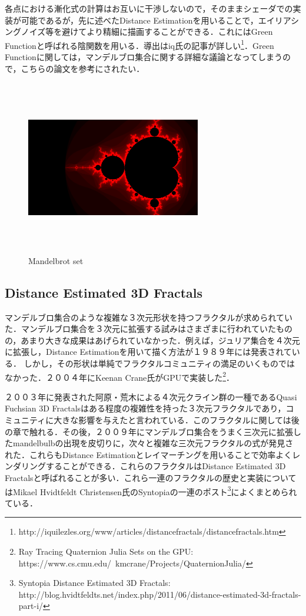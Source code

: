 各点における漸化式の計算はお互いに干渉しないので，そのままシェーダでの実装が可能であるが，先に述べたDistance Estimationを用いることで，エイリアシングノイズ等を避けてより精細に描画することができる．これにはGreen Functionと呼ばれる陰関数を用いる．導出はiq氏の記事が詳しい\footnote{http://iquilezles.org/www/articles/distancefractals/distancefractals.htm}．Green Functionに関しては，マンデルブロ集合に関する詳細な議論となってしまうので，こちらの論文\cite{mandelbrot}を参考にされたい．

\begin{figure}[htbp]
 \begin{center}
      \includegraphics[width=3in, height=3in, keepaspectratio]{../img/fractal/mandelbrot.pdf}
    \caption{Mandelbrot set}
    \label{fig:mandelbrot}
 \end{center}
\end{figure}

\subsection{Distance Estimated 3D Fractals}

マンデルブロ集合のような複雑な３次元形状を持つフラクタルが求められていた．マンデルブロ集合を３次元に拡張する試みはさまざまに行われていたものの，あまり大きな成果はあげられていなかった．例えば，ジュリア集合を４次元に拡張し，Distance Estimationを用いて描く方法が１９８９年には発表されている\cite{4djulia}．
しかし，その形状は単純でフラクタルコミュニティの満足のいくものではなかった．２００４年にKeenan Crane氏がGPUで実装した\footnote{Ray Tracing Quaternion Julia Sets on the GPU: https://www.cs.cmu.edu/~kmcrane/Projects/QuaternionJulia/}．

２００３年に発表された阿原・荒木\cite{sphairahedra}による４次元クライン群の一種であるQuasi Fuchsian 3D Fractalsはある程度の複雑性を持った３次元フラクタルであり，コミュニティに大きな影響を与えたと言われている．このフラクタルに関しては後の章で触れる．その後，２００９年にマンデルブロ集合をうまく三次元に拡張したmandelbulbの出現を皮切りに，次々と複雑な三次元フラクタルの式が発見された．これらもDistance Estimationとレイマーチングを用いることで効率よくレンダリングすることができる．これらのフラクタルはDistance Estimated 3D Fractalsと呼ばれることが多い．これら一連のフラクタルの歴史と実装についてはMikael Hvidtfeldt Christensen氏のSyntopiaの一連のポスト\footnote{Syntopia Distance Estimated 3D Fractals: http://blog.hvidtfeldts.net/index.php/2011/06/distance-estimated-3d-fractals-part-i/}によくまとめられている．

